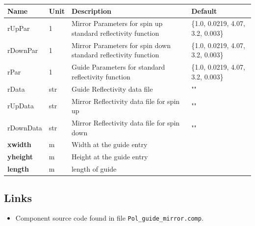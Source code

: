 \begin{longtable}{p{}p{}p{}p{}}
\toprule
\textbf{Name} & \textbf{Unit} & \textbf{Description} & \textbf{Default} \\
\midrule
\endhead
rUpPar & 1 & Mirror Parameters for spin up standard reflectivity function & \{1.0, 0.0219, 4.07, 3.2, 0.003\} \\
rDownPar & 1 & Mirror Parameters for spin down standard reflectivity function & \{1.0, 0.0219, 4.07, 3.2, 0.003\} \\
rPar & 1 & Guide Parameters for standard reflectivity function & \{1.0, 0.0219, 4.07, 3.2, 0.003\} \\
rData & str & Guide Reflectivity data file & "" \\
rUpData & str & Mirror Reflectivity data file for spin up & "" \\
rDownData & str & Mirror Reflectivity data file for spin down & "" \\
\textbf{xwidth} & m & Width at the guide entry &  \\
\textbf{yheight} & m & Height at the guide entry &  \\
\textbf{length} & m & length of guide &  \\
\bottomrule
\end{longtable}

\subsection*{Links}
\begin{itemize}
  \item Component source code found in file \texttt{Pol\_guide\_mirror.comp}.
\end{itemize}
